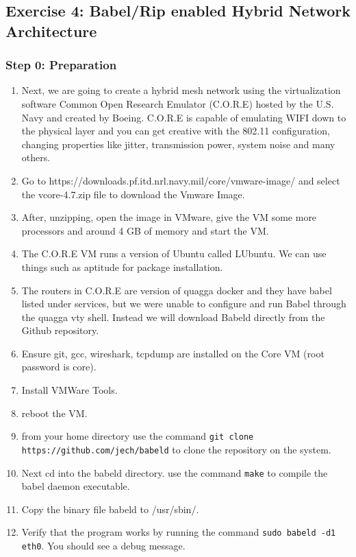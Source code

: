 \documentclass[main.tex]{subfiles}
\begin{document}
\subsection{Exercise 4: Babel/Rip enabled Hybrid Network Architecture}



\subsubsection{Step 0: Preparation}

\begin{enumerate}[noitemsep,label=$\bullet$,leftmargin=20mm,labelsep=0.5cm]

\item Next, we are going to create a hybrid mesh network using the virtualization software Common Open Research Emulator (C.O.R.E) hosted by the U.S. Navy and created by Boeing.  C.O.R.E is capable of emulating WIFI down to the physical layer and you can get creative with the 802.11 configuration, changing properties like jitter, transmission power, system noise and many others.

\item  Go to https://downloads.pf.itd.nrl.navy.mil/core/vmware-image/ and select the vcore-4.7.zip file to download the Vmware Image.

\item  After, unzipping, open the image in VMware, give the VM some more processors and around 4 GB of memory and start the VM.

\item The C.O.R.E VM runs a version of Ubuntu called LUbuntu.  We can use things such as aptitude for package installation.


\item The routers in C.O.R.E are version of quagga docker and they have babel listed under services, but we were unable to configure and run Babel through the quagga vty shell.  Instead we will download Babeld directly from the Github repository.

\item Ensure git, gcc, wireshark, tcpdump are installed on the Core VM (root password is core).
\item Install VMWare Tools.
\item reboot the VM.

\item from your home directory use the command \texttt{git clone \\ https://github.com/jech/babeld} to clone the repository on the system.
\item Next cd into the babeld directory.  use the command \texttt{make} to compile the babel daemon executable.
\item Copy the binary file babeld to /usr/sbin/.
\item Verify that the program works by running the command \texttt{sudo babeld -d1 eth0}.  You should see a debug message.


\end{enumerate}
\end{document}
